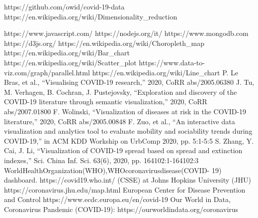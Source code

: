 \documentclass[10pt,conference]{IEEEtran}
\begin{document}
\begin{thebibliography}{00}

 https://github.com/owid/covid-19-data
 https://en.wikipedia.org/wiki/Dimensionality\_reduction

 https://www.javascript.com/
 https://nodejs.org/it/
 https://www.mongodb.com
 https://d3js.org/
 https://en.wikipedia.org/wiki/Choropleth\_map
 https://en.wikipedia.org/wiki/Bar\_chart
 https://en.wikipedia.org/wiki/Scatter\_plot
 https://www.data-to-viz.com/graph/parallel.html
 https://en.wikipedia.org/wiki/Line\_chart
 P. Le Bras, et al., “Visualising COVID-19 research,” 2020, CoRR abs/2005.06380
 J. Tu, M. Verhagen, B. Cochran, J. Pustejovsky, “Exploration and discovery of the COVID-19 literature through semantic visualization,” 2020, CoRR abs/2007.01800
 F. Wolinski, “Visualization of diseases at risk in the COVID-19 literature,” 2020, CoRR abs/2005.00848
 F. Zuo, et al., “An interactive data visualization and analytics tool to evaluate mobility and sociability trends during COVID-19,” in ACM KDD Workship on UrbComp 2020, pp. 5:1-5:5
 S. Zhang, Y. Cai, J. Li, “Visualization of COVID-19 spread based on spread and extinction indexes,” Sci. China Inf. Sci. 63(6), 2020, pp. 164102:1-164102:3
 WorldHealthOrganization(WHO),WHOcoronavirusdisease(COVID- 19) dashboard. https://covid19.who.int/
 (CSSE) at Johns Hopkins University (JHU) https://coronavirus.jhu.edu/map.html
 European Center for Disease Prevention and Control https://www.ecdc.europa.eu/en/covid-19
 Our World in Data, Coronavirus Pandemic (COVID-19): https://ourworldindata.org/coronavirus 

\end{thebibliography}
\end{document}
